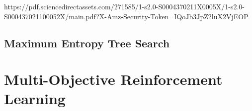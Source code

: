         https://pdf.sciencedirectassets.com/271585/1-s2.0-S0004370211X0005X/1-s2.0-S000437021100052X/main.pdf?X-Amz-Security-Token=IQoJb3JpZ2luX2VjEOP%
    
    \subsection{Maximum Entropy Tree Search}
    \label{sec:3-2-3-ments}


\section{Multi-Objective Reinforcement Learning}
\label{sec:3-3-morl}

